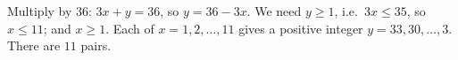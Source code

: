 Multiply by $36$: $3x+y=36$, so $y=36-3x$. We need $y\ge1$, i.e.\ $3x\le35$, so $x\le11$; and $x\ge1$. Each of $x=1,2,\dots,11$ gives a positive integer $y=33,30,\dots,3$. There are $\boxed{11}$ pairs.

